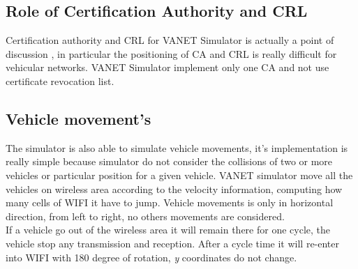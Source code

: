 \subsection{Role of Certification Authority and CRL}
Certification authority and CRL for VANET Simulator is actually a point of discussion \cite{calandriello}, in particular the positioning of CA and CRL is really difficult for vehicular networks. VANET Simulator implement only one CA and not use certificate revocation list. 
\subsection{Vehicle movement's}
The simulator is also able to simulate vehicle movements, it's implementation is really simple because simulator do not consider the collisions of two or more vehicles or particular position for a given vehicle. VANET simulator move all the vehicles on wireless area according to the velocity information, computing how many cells of WIFI it have to jump. Vehicle movements is only in horizontal direction, from left to right, no others movements are considered.\\
If a vehicle go out of the wireless area it will remain there for one cycle, the vehicle stop any transmission and reception. After a cycle time it will re-enter into WIFI with 180 degree of rotation, \textit{y} coordinates do not change.